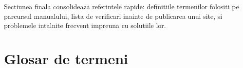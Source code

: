 \clearpage
{}
\setcounter{section}{0}
{}

Sectiunea finala consolideaza referintele rapide: definitiile termenilor folositi pe parcursul manualului, lista de verificari inainte de publicarea unui site, si problemele intalnite frecvent impreuna cu solutiile lor.

\section{Glosar de termeni}

